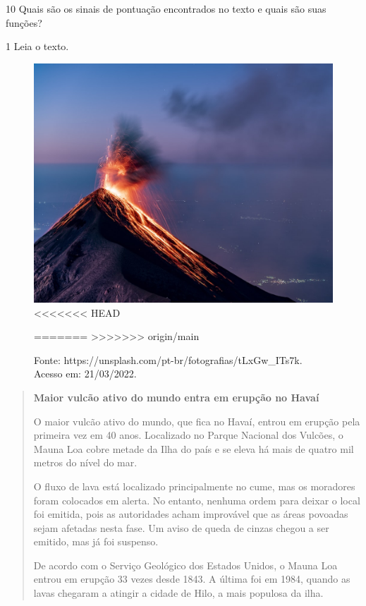 

\num{10} Quais são os sinais de pontuação encontrados no texto e quais são
suas funções?




\num{1} Leia o texto.

\begin{figure}[htpb!]
\includegraphics[width=.5\textwidth]{./imgs/img9.jpg}
<<<<<<< HEAD
\caption{Fonte: https://unsplash.com/pt-br/fotografias/tLxGw\_ITs7k. Acesso em: 21/03/2022.}
=======
>>>>>>> origin/main
\end{figure}

\begin{quote}
\textbf{Maior vulcão ativo do mundo entra em erupção no Havaí}

O maior vulcão ativo do mundo, que fica no Havaí, entrou em erupção pela primeira vez em 40 anos. Localizado no Parque Nacional dos Vulcões, o Mauna Loa cobre metade da Ilha do país e se eleva há mais de quatro mil metros do nível do mar.

O fluxo de lava está localizado principalmente no cume, mas os moradores foram colocados em alerta. No entanto, nenhuma ordem para deixar o local foi emitida, pois as autoridades acham improvável que as áreas povoadas sejam afetadas nesta fase. Um aviso de queda de cinzas chegou a ser emitido, mas já foi suspenso.

De acordo com o Serviço Geológico dos Estados Unidos, o Mauna Loa entrou em erupção 33 vezes desde 1843. A última foi em 1984, quando as lavas chegaram a atingir a cidade de Hilo, a mais populosa da ilha.

\end{quote}

